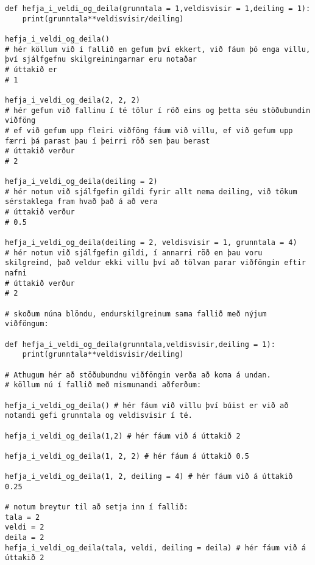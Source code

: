 \begin{lstlisting}[caption=Sjálfgefin viðföng kynnt, label=lst:foll-sjalfgefin]
def hefja_i_veldi_og_deila(grunntala = 1,veldisvisir = 1,deiling = 1):	
	print(grunntala**veldisvisir/deiling)
	
hefja_i_veldi_og_deila() 
# hér köllum við í fallið en gefum því ekkert, við fáum þó enga villu, því sjálfgefnu skilgreiningarnar eru notaðar
# úttakið er
# 1

hefja_i_veldi_og_deila(2, 2, 2)
# hér gefum við fallinu í té tölur í röð eins og þetta séu stöðubundin viðföng
# ef við gefum upp fleiri viðföng fáum við villu, ef við gefum upp færri þá parast þau í þeirri röð sem þau berast
# úttakið verður 
# 2 

hefja_i_veldi_og_deila(deiling = 2)
# hér notum við sjálfgefin gildi fyrir allt nema deiling, við tökum sérstaklega fram hvað það á að vera
# úttakið verður
# 0.5

hefja_i_veldi_og_deila(deiling = 2, veldisvisir = 1, grunntala = 4)
# hér notum við sjálfgefin gildi, í annarri röð en þau voru skilgreind, það veldur ekki villu því að tölvan parar viðföngin eftir nafni
# úttakið verður
# 2

# skoðum núna blöndu, endurskilgreinum sama fallið með nýjum viðföngum:

def hefja_i_veldi_og_deila(grunntala,veldisvisir,deiling = 1):	
	print(grunntala**veldisvisir/deiling)

# Athugum hér að stöðubundnu viðföngin verða að koma á undan.
# köllum nú í fallið með mismunandi aðferðum:

hefja_i_veldi_og_deila() # hér fáum við villu því búist er við að notandi gefi grunntala og veldisvisir í té.

hefja_i_veldi_og_deila(1,2) # hér fáum við á úttakið 2 

hefja_i_veldi_og_deila(1, 2, 2) # hér fáum á úttakið 0.5

hefja_i_veldi_og_deila(1, 2, deiling = 4) # hér fáum við á úttakið 0.25

# notum breytur til að setja inn í fallið:
tala = 2
veldi = 2
deila = 2
hefja_i_veldi_og_deila(tala, veldi, deiling = deila) # hér fáum við á úttakið 2

\end{lstlisting}

